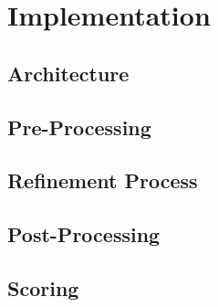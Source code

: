\chapter{Implementation}

	\section{Architecture}
	
	\section{Pre-Processing}
	
	\section{Refinement Process}
	
	\section{Post-Processing}
	
	\section{Scoring}
